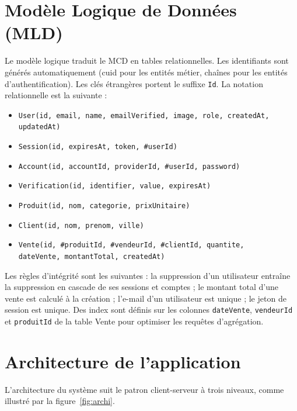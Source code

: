 \documentclass[11pt,a4paper]{report}
\begin{document}
\section{Modèle Logique de Données (MLD)}
Le modèle logique traduit le MCD en tables relationnelles. Les identifiants sont
générés automatiquement (cuid pour les entités métier, chaînes pour les entités
d'authentification). Les clés étrangères portent le suffixe \texttt{Id}. La
notation relationnelle est la suivante :
\begin{itemize}
  \item \texttt{User(id, email, name, emailVerified, image, role, createdAt, updatedAt)}
  \item \texttt{Session(id, expiresAt, token, \#userId)}
  \item \texttt{Account(id, accountId, providerId, \#userId, password)}
  \item \texttt{Verification(id, identifier, value, expiresAt)}
  \item \texttt{Produit(id, nom, categorie, prixUnitaire)}
  \item \texttt{Client(id, nom, prenom, ville)}
  \item \texttt{Vente(id, \#produitId, \#vendeurId, \#clientId, quantite,}\\
        \texttt{\phantom{Vente(}dateVente, montantTotal, createdAt)}
\end{itemize}

Les règles d'intégrité sont les suivantes : la suppression d'un utilisateur
entraîne la suppression en cascade de ses sessions et comptes ; le montant total
d'une vente est calculé à la création ; l'e-mail d'un utilisateur est unique ; le
jeton de session est unique. Des index sont définis sur les colonnes
\texttt{dateVente}, \texttt{vendeurId} et \texttt{produitId} de la table Vente
pour optimiser les requêtes d'agrégation.

\section{Architecture de l'application}
L'architecture du système suit le patron client-serveur à trois niveaux, comme
illustré par la figure~\ref{fig:archi}.
\end{document}
